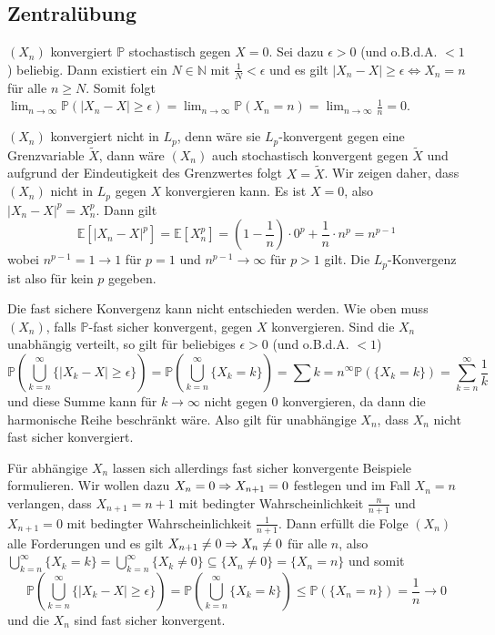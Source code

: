 \documentclass[a4paper]{article}
\begin{document}
\makeexheader

\subsection{Zentralübung}

$(X_n)$ konvergiert $\mathds{P}$ stochastisch gegen $X = 0$.
Sei dazu $\epsilon > 0$ (und o.B.d.A. $< 1$) beliebig.
Dann existiert ein $N \in \mathds{N}$ mit $\frac{1}{N} < \epsilon$ und es gilt $|X_n - X| \geq \epsilon \iff X_n = n$ für alle $n \geq N$.
Somit folgt $\lim_{n \to \infty} \mathds{P}(|X_n - X| \geq \epsilon) = \lim_{n \to \infty} \mathds{P}(X_n = n) = \lim_{n \to \infty} \frac{1}{n} = 0$.

$(X_n)$ konvergiert nicht in $L_p$, denn wäre sie $L_p$-konvergent gegen eine Grenzvariable $\tilde{X}$, dann wäre $(X_n)$ auch stochastisch konvergent gegen $\tilde{X}$ und aufgrund der Eindeutigkeit des Grenzwertes folgt $X = \tilde{X}$.
Wir zeigen daher, dass $(X_n)$ nicht in $L_p$ gegen $X$ konvergieren kann. Es ist $X = 0$, also $|X_n - X|^p = X_n^p$. Dann gilt
\begin{equation*}
    \mathds{E}[|X_n - X|^p] = \mathds{E}[X_n^p] = (1 - \frac{1}{n}) \cdot 0^p + \frac{1}{n} \cdot n^p = n^{p-1}
\end{equation*}
wobei $n^{p-1} = 1 \to 1$ für $p =1$ und $n^{p-1} \to \infty$ für $p > 1$ gilt.
Die $L_p$-Konvergenz ist also für kein $p$ gegeben.

Die fast sichere Konvergenz kann nicht entschieden werden.
Wie oben muss $(X_n)$, falls $\mathds{P}$-fast sicher konvergent, gegen $X$ konvergieren.
 Sind die $X_n$ unabhängig verteilt, so gilt für beliebiges $\epsilon > 0$ (und o.B.d.A. $< 1$)
\begin{equation*}
    \mathds{P}(\bigcup_{k = n}^\infty \{|X_k - X| \geq \epsilon\}) =  \mathds{P}(\bigcup_{k = n}^\infty \{ X_k = k\} ) = \sum{k = n}^\infty \mathds{P}(\{ X_k = k\} ) = \sum_{k = n}^{\infty} \frac{1}{k}
\end{equation*}
und diese Summe kann für $k \to \infty$ nicht gegen $0$ konvergieren, da dann die harmonische Reihe beschränkt wäre.
Also gilt für unabhängige $X_n$, dass $X_n$ nicht fast sicher konvergiert.

Für abhängige $X_n$ lassen sich allerdings fast sicher konvergente Beispiele formulieren. 
Wir wollen dazu $X_n = 0 \Rightarrow X_{n+1} =0$ festlegen und im Fall $X_n = n$ verlangen, dass $X_{n+1} = n+1$ mit bedingter Wahrscheinlichkeit $\frac{n}{n+1}$ und $X_{n+1} = 0$ mit bedingter Wahrscheinlichkeit $\frac{1}{n+1}$.
Dann erfüllt die Folge $(X_n)$ alle Forderungen und es gilt $X_{n+1} \neq 0 \Rightarrow X_n \neq 0$ für alle $n$, also $\bigcup_{k = n}^\infty \{ X_k = k\} = \bigcup_{k = n}^\infty \{ X_k \neq 0\} \subseteq \{X_n \neq 0\} = \{X_n = n\}$ und somit
\begin{equation*}
    \mathds{P}(\bigcup_{k = n}^\infty \{|X_k - X| \geq \epsilon\}) =  \mathds{P}(\bigcup_{k = n}^\infty \{ X_k = k\} ) \leq \mathds{P}(\{X_n = n\}) = \frac{1}{n} \to 0
\end{equation*}
und die $X_n$ sind fast sicher konvergent.
\end{document}
